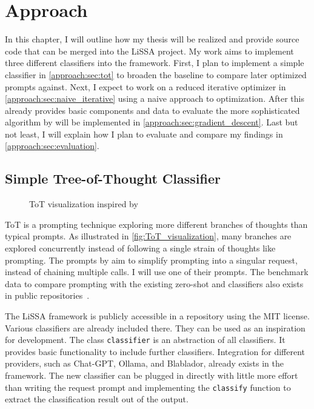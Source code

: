\chapter{Approach}
In this chapter, I will outline how my thesis will be realized and provide source code that can be merged into the LiSSA project.
My work aims to implement three different classifiers into the framework.
First, I plan to implement a simple \ToT classifier in \autoref{approach:sec:tot} to broaden the baseline to compare later optimized prompts against.
Next, I expect to work on a reduced iterative optimizer in \autoref{approach:sec:naive_iterative} using a naive approach to optimization.
After this already provides basic components and data to evaluate the more sophisticated algorithm by  will be implemented in \autoref{approach:sec:gradient_descent}.
Last but not least, I will explain how I plan to evaluate and compare my findings in \autoref{approach:sec:evaluation}.

\section{Simple Tree-of-Thought Classifier}
\label{approach:sec:tot}

\begin{figure}
    \centering
    
    \caption{\Ac{ToT} visualization inspired by }
    \label{fig:ToT_visualization}
\end{figure}

\Ac{ToT} is a prompting technique exploring more different branches of thoughts than typical \CoT prompts.
As illustrated in \autoref{fig:ToT_visualization}, many branches are explored concurrently instead of following a single strain of thoughts like \CoT prompting.
The prompts by  aim to simplify \ToT prompting into a singular request, instead of chaining multiple calls.
I will use one of their prompts.
The benchmark data to compare \ToT prompting with the existing zero-shot and \CoT classifiers also exists in public repositories~\cite{fuchss2022ArDoCoBenchmark, hey2025ReplicationPackage}.

The LiSSA framework is publicly accessible in a repository using the MIT license. Various classifiers are already included there.
They can be used as an inspiration for development.
The class \verb|classifier| is an abstraction of all classifiers.
It provides basic functionality to include further classifiers.
Integration for different \LLM providers, such as Chat-GPT, Ollama, and Blablador, already exists in the framework.
The new classifier can be plugged in directly with little more effort than writing the request prompt and implementing the \verb|classify| function to extract the classification result out of the \LLM output.

